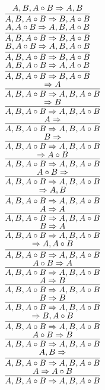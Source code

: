 \documentclass[11pt]{article}
\begin{document}
\begin{center}
\bigskip
\\$\infer{A, B, A\circ B\Rightarrow B, A\circ B}{A, B, A\circ B\Rightarrow A, B}$
\bigskip
\\$\infer{A, B, A\circ B\Rightarrow B, A\circ B}{A, A\circ B\Rightarrow A, B, A\circ B}$
\bigskip
\\$\infer{A, B, A\circ B\Rightarrow B, A\circ B}{B, A\circ B\Rightarrow A, B, A\circ B}$
\bigskip
\\$\infer{A, B, A\circ B\Rightarrow B, A\circ B}{A, B, A\circ B\Rightarrow A, A\circ B}$
\bigskip
\\$\infer{A, B, A\circ B\Rightarrow A, B, A\circ B}{\Rightarrow A}$
\bigskip
\\$\infer{A, B, A\circ B\Rightarrow A, B, A\circ B}{\Rightarrow B}$
\bigskip
\\$\infer{A, B, A\circ B\Rightarrow A, B, A\circ B}{A\Rightarrow }$
\bigskip
\\$\infer{A, B, A\circ B\Rightarrow A, B, A\circ B}{B\Rightarrow }$
\bigskip
\\$\infer{A, B, A\circ B\Rightarrow A, B, A\circ B}{\Rightarrow A\circ B}$
\bigskip
\\$\infer{A, B, A\circ B\Rightarrow A, B, A\circ B}{A\circ B\Rightarrow }$
\bigskip
\\$\infer{A, B, A\circ B\Rightarrow A, B, A\circ B}{\Rightarrow A, B}$
\bigskip
\\$\infer{A, B, A\circ B\Rightarrow A, B, A\circ B}{A\Rightarrow A}$
\bigskip
\\$\infer{A, B, A\circ B\Rightarrow A, B, A\circ B}{B\Rightarrow A}$
\bigskip
\\$\infer{A, B, A\circ B\Rightarrow A, B, A\circ B}{\Rightarrow A, A\circ B}$
\bigskip
\\$\infer{A, B, A\circ B\Rightarrow A, B, A\circ B}{A\circ B\Rightarrow A}$
\bigskip
\\$\infer{A, B, A\circ B\Rightarrow A, B, A\circ B}{A\Rightarrow B}$
\bigskip
\\$\infer{A, B, A\circ B\Rightarrow A, B, A\circ B}{B\Rightarrow B}$
\bigskip
\\$\infer{A, B, A\circ B\Rightarrow A, B, A\circ B}{\Rightarrow B, A\circ B}$
\bigskip
\\$\infer{A, B, A\circ B\Rightarrow A, B, A\circ B}{A\circ B\Rightarrow B}$
\bigskip
\\$\infer{A, B, A\circ B\Rightarrow A, B, A\circ B}{A, B\Rightarrow }$
\bigskip
\\$\infer{A, B, A\circ B\Rightarrow A, B, A\circ B}{A\Rightarrow A\circ B}$

\end{center}
\end{document}

